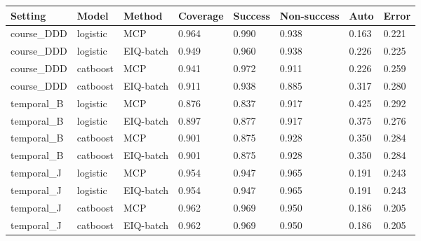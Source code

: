 \begin{tabular}{llllllll}
\toprule
Setting & Model & Method & Coverage & Success & Non-success & Auto & Error\\
\midrule
course\_DDD & logistic & MCP & 0.964 & 0.990 & 0.938 & 0.163 & 0.221\\
course\_DDD & logistic & EIQ-batch & 0.949 & 0.960 & 0.938 & 0.226 & 0.225\\
course\_DDD & catboost & MCP & 0.941 & 0.972 & 0.911 & 0.226 & 0.259\\
course\_DDD & catboost & EIQ-batch & 0.911 & 0.938 & 0.885 & 0.317 & 0.280\\
temporal\_B & logistic & MCP & 0.876 & 0.837 & 0.917 & 0.425 & 0.292\\
temporal\_B & logistic & EIQ-batch & 0.897 & 0.877 & 0.917 & 0.375 & 0.276\\
temporal\_B & catboost & MCP & 0.901 & 0.875 & 0.928 & 0.350 & 0.284\\
temporal\_B & catboost & EIQ-batch & 0.901 & 0.875 & 0.928 & 0.350 & 0.284\\
temporal\_J & logistic & MCP & 0.954 & 0.947 & 0.965 & 0.191 & 0.243\\
temporal\_J & logistic & EIQ-batch & 0.954 & 0.947 & 0.965 & 0.191 & 0.243\\
temporal\_J & catboost & MCP & 0.962 & 0.969 & 0.950 & 0.186 & 0.205\\
temporal\_J & catboost & EIQ-batch & 0.962 & 0.969 & 0.950 & 0.186 & 0.205\\
\bottomrule
\end{tabular}